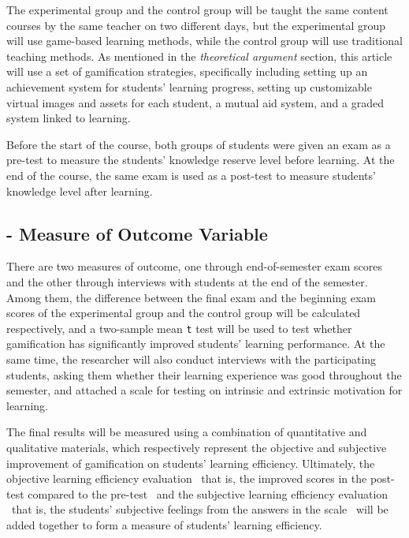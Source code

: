 \documentclass[12pt]{article} %
\begin{document}
\noindent The experimental group and the control group will be taught the same content courses by the same teacher on two different days, but the experimental group will use game-based learning methods, while the control group will use traditional teaching methods. As mentioned in the \textit{theoretical argument} section, this article will use a set of gamification strategies, specifically including setting up an achievement system for students' learning progress, setting up customizable virtual images and assets for each student, a mutual aid system, and a graded system linked to learning.

\noindent Before the start of the course, both groups of students were given an exam as a pre-test to measure the students' knowledge reserve level before learning. At the end of the course, the same exam is used as a post-test to measure students' knowledge level after learning.

\subsection*{- Measure of Outcome Variable}

\vspace{.3cm}

\noindent There are two measures of outcome, one through end-of-semester exam scores and the other through interviews with students at the end of the semester. Among them, the difference between the final exam and the beginning exam scores of the experimental group and the control group will be calculated respectively, and a two-sample mean \texttt{t} test will be used to test whether gamification has significantly improved students' learning performance. At the same time, the researcher will also conduct interviews with the participating students, asking them whether their learning experience was good throughout the semester, and attached a scale for testing on intrinsic and extrinsic motivation for learning.

\noindent The final results will be measured using a combination of quantitative and qualitative materials, which respectively represent the objective and subjective improvement of gamification on students' learning efficiency. Ultimately, the objective learning efficiency evaluation \textemdash\ that is, the improved scores in the post-test compared to the pre-test \textemdash\ and the subjective learning efficiency evaluation \textemdash\ that is, the students' subjective feelings from the answers in the scale \textemdash\ will be added together to form a measure  of students' learning efficiency.
\end{document}
